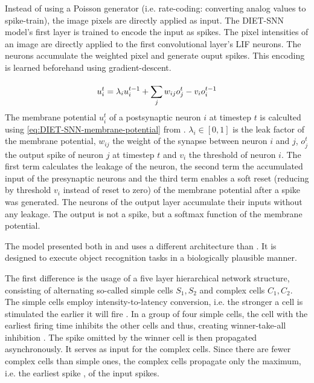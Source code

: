 Instead of using a Poisson generator (i.e. rate-coding: converting analog values to spike-train), the image pixels are directly applied as input.
The \ac{DIET}-\ac{SNN} model's first layer is trained to encode the input as spikes.
The pixel intensities of an image are directly applied to the first convolutional layer's \ac{LIF} neurons.
The neurons accumulate the weighted pixel and generate ouput spikes.
This encoding is learned beforehand using gradient-descent.

\begin{equation}
    \centering
    \label{eq:DIET-SNN-membrane-potential}
    u_i^t = \lambda_i u_i^{t-1} + \sum_{j}^{}w_{ij}o_j^t-v_{i}o_i^{t-1}
\end{equation}
%
The membrane potential $u_i^t$ of a postsynaptic neuron $i$ at timestep $t$ 
is calculted using \autoref{eq:DIET-SNN-membrane-potential} from \cite{DIET_SNN}. 
$\lambda_i \in [0,1]$ is the leak factor of the membrane potential, 
$w_{ij}$ the weight of the synapse between neuron $i$ and $j$, 
$o_j^t$ the output spike of neuron $j$ at timestep $t$ and 
$v_i$ the threshold of neuron $i$.
The first term calculates the leakage of the neuron,
the second term the accumulated input of the presynaptic neurons and
the third term enables a soft reset (reducing by threshold $v_i$ instead of reset to zero) of the membrane potential after a spike was generated.
The neurons of the output layer accumulate their inputs without any leakage.
The output is not a spike, but a softmax function of the membrane potential.

The model presented both in \cite{multi_scale_STDP} and \cite{STDP_vis_feat} uses a different architecture than \cite{SNN}.
It is designed to execute object recognition tasks in a biologically plausible manner.

The first difference is the usage of a five layer hierarchical network structure, consisting of alternating so-called simple cells $S_1, S_2$ and complex cells $C_1, C_2$.
The simple cells employ intensity-to-latency conversion, i.e. the stronger a cell is stimulated the earlier it will fire \cite{STDP_vis_feat}.
In a group of four simple cells, the cell with the earliest firing time inhibits the other cells and thus, creating winner-take-all inhibition \cite{multi_scale_STDP}.
The spike omitted by the winner cell is then propagated asynchronously.
It serves as input for the complex cells.
Since there are fewer complex cells than simple ones, the complex cells propagate only the maximum, i.e. the earliest spike \cite{STDP_vis_feat}, of the input spikes.

